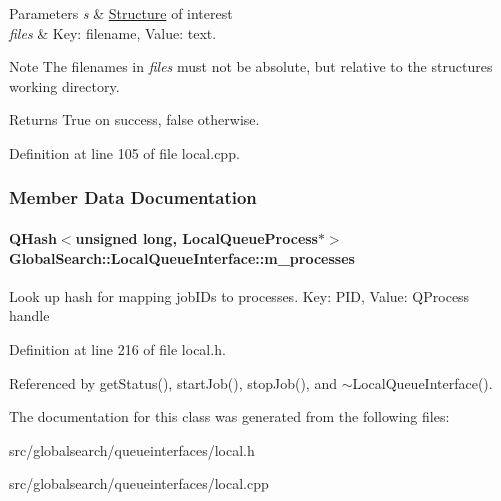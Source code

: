 \begin{DoxyParams}{Parameters}
{\em s} & \hyperlink{classGlobalSearch_1_1Structure}{Structure} of interest \\
\hline
{\em files} & Key\+: filename, Value\+: text.\\
\hline
\end{DoxyParams}
\begin{DoxyNote}{Note}
The filenames in {\itshape files} must not be absolute, but relative to the structure\textquotesingle{}s working directory.
\end{DoxyNote}
\begin{DoxyReturn}{Returns}
True on success, false otherwise. 
\end{DoxyReturn}


Definition at line 105 of file local.\+cpp.



\subsubsection{Member Data Documentation}
\hypertarget{classGlobalSearch_1_1LocalQueueInterface_a7a7326a16048896fd7c88d17e3973cda}{}
\paragraph[{m\+\_\+processes}]{\setlength{\rightskip}{0pt plus 5cm}Q\+Hash$<$unsigned long, Local\+Queue\+Process$\ast$$>$ Global\+Search\+::\+Local\+Queue\+Interface\+::m\+\_\+processes\hspace{0.3cm}{\ttfamily [protected]}}\label{classGlobalSearch_1_1LocalQueueInterface_a7a7326a16048896fd7c88d17e3973cda}
Look up hash for mapping job\+I\+D\textquotesingle{}s to processes. Key\+: P\+I\+D, Value\+: Q\+Process handle 

Definition at line 216 of file local.\+h.



Referenced by get\+Status(), start\+Job(), stop\+Job(), and $\sim$\+Local\+Queue\+Interface().



The documentation for this class was generated from the following files\+:\begin{DoxyCompactItemize}
\item 
src/globalsearch/queueinterfaces/local.\+h\item 
src/globalsearch/queueinterfaces/local.\+cpp\end{DoxyCompactItemize}
